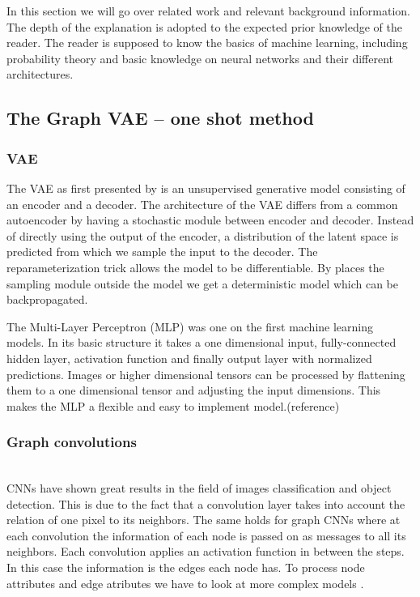 In this section we will go over related work and relevant background information. The depth of the explanation is adopted to the expected prior knowledge of the reader. The reader is supposed to know the basics of machine learning, including probability theory and basic knowledge on neural networks and their different architectures.

\subsection{The Graph VAE – one shot method}

\subsubsection{VAE}
The VAE as first presented by \cite{kingma_auto-encoding_2014} is an unsupervised generative model consisting of an encoder and a decoder. The architecture of the VAE differs from a common autoencoder by having a stochastic module between encoder and decoder. Instead of directly using the output of the encoder, a distribution of the latent space is predicted from which we sample the input to the decoder. The reparameterization trick allows the model to be differentiable. By places the sampling module outside the model we get a deterministic model which can be backpropagated.

The Multi-Layer Perceptron (MLP) was one on the first machine learning models. In its basic structure it takes a one dimensional input, fully-connected hidden layer, activation function and finally output layer with normalized predictions.
Images or higher dimensional tensors can be processed by flattening them to a one dimensional tensor and adjusting the input dimensions. This makes the MLP a flexible and easy to implement model.(reference)
\\
\subsubsection{Graph convolutions}\\
CNNs have shown great results in the field of images classification and object detection. This is due to the fact that a convolution layer takes into account the relation of one pixel to its neighbors. The same holds for graph CNNs where at each convolution the information of each node is passed on as messages to all its neighbors. Each convolution applies an activation function in between the steps. In this case the information is the edges each node has. To process node attributes and edge atributes we have to look at more complex models \cite{tiao_variational_nodate}. 
\\
